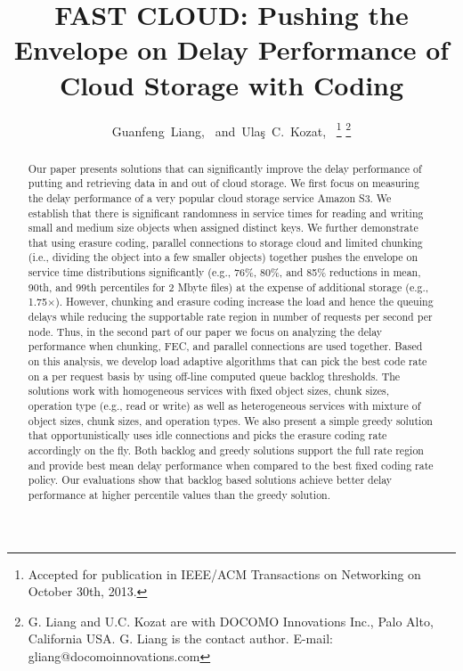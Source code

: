 \documentclass[journal]{IEEEtran}
\begin{document}
\title{FAST CLOUD: Pushing the Envelope on Delay Performance of Cloud Storage with Coding}


\author{Guanfeng~Liang,~
        and~Ula\c{s}~C.~Kozat,~
\thanks{Accepted for publication in IEEE/ACM Transactions on Networking on October 30th, 2013.}
\thanks{G. Liang and U.C. Kozat are with DOCOMO Innovations Inc., Palo Alto, California USA. G. Liang is the contact author. E-mail: gliang@docomoinnovations.com}
}
\maketitle


\begin{abstract}
Our paper presents solutions that can significantly improve the delay performance of putting and retrieving data in and out of cloud storage. We first focus on measuring the delay performance of a very popular cloud storage service Amazon S3. We establish that there is significant randomness in service times for reading and writing small and medium size objects when assigned distinct keys. We further demonstrate that using erasure coding, parallel connections to storage cloud and limited chunking (i.e., dividing the object into a few smaller objects)  together pushes the envelope on service time distributions significantly (e.g., 76\%, 80\%, and 85\% reductions in mean, 90th, and 99th percentiles for 2 Mbyte files) at the expense of additional storage (e.g., 1.75$\times$). However, chunking and erasure coding increase the load and hence the queuing delays while reducing the supportable rate region in number of requests per second per node. Thus, in the second part of our paper we focus on analyzing the delay performance when chunking, FEC, and parallel connections are used together. Based on this analysis, we develop load adaptive algorithms that can pick the best code rate on a per request basis by using off-line computed queue backlog thresholds. The solutions work with homogeneous services with fixed object sizes, chunk sizes, operation type (e.g., read or write) as well as heterogeneous services with mixture of object sizes, chunk sizes, and operation types. We also present a simple greedy solution that opportunistically uses idle connections and picks the erasure coding rate accordingly on the fly. Both backlog and greedy solutions support the full rate region and provide best mean delay performance when compared to the best fixed coding rate policy. Our evaluations show that backlog based solutions achieve better delay performance at higher percentile values than the greedy solution.

\end{abstract}
\end{document}
